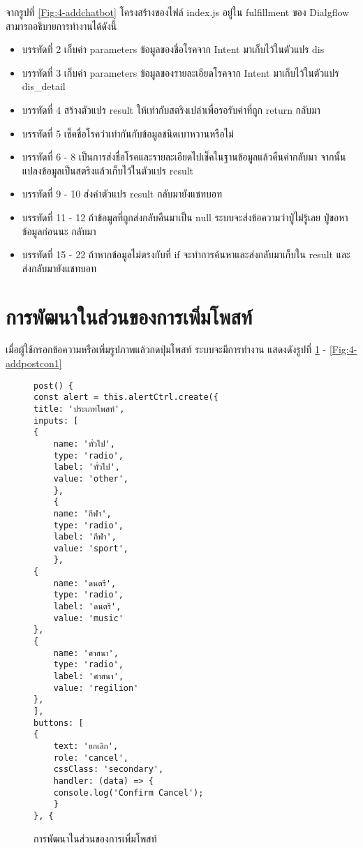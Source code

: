จากรูปที่ \ref{Fig:4-addchatbot} โครงสร้างของไฟล์ index.js อยู่ใน fulfillment ของ Dialgflow สามารถอธิบายการทำงานได้ดังนี้
\begin{itemize}[label={--}]
\item บรรทัดที่ 2 เก็บค่า parameters ข้อมูลของชื่อโรคจาก Intent มาเก็บไว้ในตัวแปร dis
\item บรรทัดที่ 3 เก็บค่า parameters ข้อมูลของรายละเอียดโรคจาก Intent มาเก็บไว้ในตัวแปร dis_detail
\item บรรทัดที่ 4 สร้างตัวแปร result ให้เท่ากับสตริงเปล่าเพื่อรอรับค่าที่ถูก return กลับมา
\item บรรทัดที่ 5 เช็คชื่อโรคว่าเท่ากันกับข้อมูลชนิดเบาหวานหรือไม่
\item บรรทัดที่ 6 - 8 เป็นการส่งชื่อโรคและรายละเอียดไปเช็คในฐานข้อมูลแล้วคืนค่ากลับมา จากนั้นแปลงข้อมูลเป็นสตริงแล้วเก็บไว้ในตัวแปร result
\item บรรทัดที่ 9 - 10 ส่งค่าตัวแปร result กลับมายังแชทบอท
\item บรรทัดที่ 11 - 12 ถ้าข้อมูลที่ถูกส่งกลับคืนมาเป็น null ระบบจะส่งข้อความว่าปู่ไม่รู้เลย ปู่ขอหาข้อมูลก่อนนะ กลับมา
\item บรรทัดที่ 15 - 22 ถ้าหากข้อมูลไม่ตรงกับที่ if จะทำการค้นหาและส่งกลับมาเก็บใน result และส่งกลับมายังแชทบอท
\end{itemize}
\newpage



\section{การพัฒนาในส่วนของการเพิ่มโพสท์}
เมื่อผู้ใช้กรอกข้อความหรือเพิ่มรูปภาพแล้วกดปุ่มโพสท์ ระบบจะมีการทำงาน แสดงดังรูปที่ \ref{Fig:4-addpost} - \ref{Fig:4-addpostcon1}

\begin{figure}[H]
{\lstset{language=Pascal}
\begin{lstlisting}
post() {
const alert = this.alertCtrl.create({
title: 'ประเภทโพสท์',
inputs: [
{
	name: 'ทั่วไป',
	type: 'radio',
	label: 'ทั่วไป',
	value: 'other',
	},
	{
	name: 'กีฬา',
	type: 'radio',
	label: 'กีฬา',
	value: 'sport',
	},
{
	name: 'ดนตรี',
	type: 'radio',
	label: 'ดนตรี',
	value: 'music'
},
{
	name: 'ศาสนา',
	type: 'radio',
	label: 'ศาสนา',
	value: 'regilion'
},
],
buttons: [
{
	text: 'ยกเลิก',
	role: 'cancel',
	cssClass: 'secondary',
	handler: (data) => {
	console.log('Confirm Cancel');
	}
}, {
\end{lstlisting}}
\caption{การพัฒนาในส่วนของการเพิ่มโพสท์}
\label{Fig:4-addpost}
\end{figure}
\newpage

